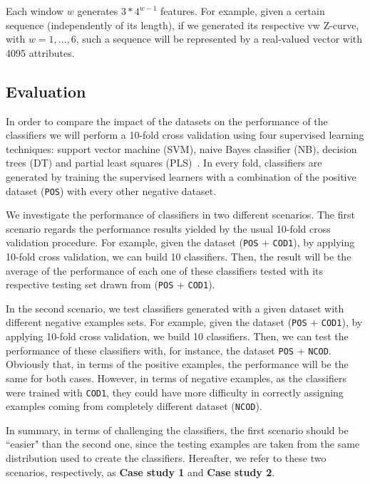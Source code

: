 \documentclass[conference,letterpaper]{IEEEtran}
\begin{document}
Each window $w$ generates $ 3*4^{w-1} $ features. For example, given a certain sequence (independently of its length), if we generated its respective vw Z-curve, with $ w = 1, ..., 6 $, such a sequence will be represented by a real-valued vector with 4095 attributes.

\subsection{Evaluation}

In order to compare the impact of the  datasets on the performance of the classifiers  we will perform a 10-fold cross validation using four supervised learning techniques: support vector machine (SVM), naive Bayes classifier (NB), decision trees (DT) and partial least squares (PLS)~\cite{song2011a,mitchell1997}. In every fold, classifiers are generated by training the supervised learners with a combination of the positive dataset ({\tt POS}) with every other negative dataset.

We investigate the performance of classifiers in two different scenarios. The first scenario regards the performance results yielded by the usual 10-fold cross validation procedure. For example, given the dataset ({\tt POS} + {\tt COD1}), by applying 10-fold cross validation, we can build 10 classifiers. Then, the result will be the average of the performance of each one of these classifiers tested with its respective testing set drawn from ({\tt POS} + {\tt COD1}).

In the second scenario, we test classifiers generated with a given dataset with different negative examples sets. For example, given the dataset ({\tt POS} + {\tt COD1}), by applying 10-fold cross validation, we build 10 classifiers. Then, we can test the performance of these classifiers with, for instance, the dataset {\tt POS} + {\tt NCOD}. Obviously that, in terms of the positive examples, the performance will be the same for both cases. However, in terms of negative examples, as the classifiers were trained with {\tt COD1}, they could have more difficulty in correctly assigning examples coming from completely different dataset ({\tt NCOD}).

In summary, in terms of challenging the classifiers, the first scenario should be ``easier" than the second one, since the testing examples are taken from the same distribution used to create the classifiers. Hereafter, we refer to these two scenarios, respectively, as {\bf Case study 1} and {\bf Case study 2}.
\end{document}
